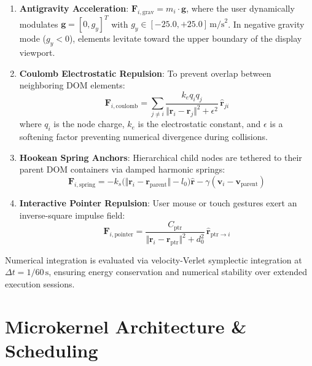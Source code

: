 \documentclass[10pt,twocolumn,letterpaper]{article}
\begin{document}
\begin{enumerate}
    \item \textbf{Antigravity Acceleration}:
    $\mathbf{F}_{i,\mathrm{grav}} = m_i \cdot \mathbf{g}$, where the user dynamically modulates $\mathbf{g} = [0, g_y]^T$ with $g_y \in [-25.0, +25.0]\,\mathrm{m/s}^2$. In negative gravity mode ($g_y < 0$), elements levitate toward the upper boundary of the display viewport.
    
    \item \textbf{Coulomb Electrostatic Repulsion}:
    To prevent overlap between neighboring DOM elements:
    \begin{equation}
        \mathbf{F}_{i,\mathrm{coulomb}} = \sum_{j \neq i} \frac{k_e q_i q_j}{\Vert \mathbf{r}_i - \mathbf{r}_j \Vert^2 + \epsilon^2} \, \hat{\mathbf{r}}_{ji}
    \end{equation}
    where $q_i$ is the node charge, $k_e$ is the electrostatic constant, and $\epsilon$ is a softening factor preventing numerical divergence during collisions.
    
    \item \textbf{Hookean Spring Anchors}:
    Hierarchical child nodes are tethered to their parent DOM containers via damped harmonic springs:
    \begin{equation}
        \mathbf{F}_{i,\mathrm{spring}} = -k_s \big( \Vert \mathbf{r}_i - \mathbf{r}_{\mathrm{parent}} \Vert - l_0 \big) \hat{\mathbf{r}} - \gamma (\mathbf{v}_i - \mathbf{v}_{\mathrm{parent}})
    \end{equation}
    
    \item \textbf{Interactive Pointer Repulsion}:
    User mouse or touch gestures exert an inverse-square impulse field:
    \begin{equation}
        \mathbf{F}_{i,\mathrm{pointer}} = \frac{C_{\mathrm{ptr}}}{\Vert \mathbf{r}_i - \mathbf{r}_{\mathrm{ptr}} \Vert^2 + d_0^2} \, \hat{\mathbf{r}}_{\mathrm{ptr}\to i}
    \end{equation}
\end{enumerate}

Numerical integration is evaluated via velocity-Verlet symplectic integration at $\Delta t = 1/60\,\mathrm{s}$, ensuring energy conservation and numerical stability over extended execution sessions.

\section{Microkernel Architecture \& Scheduling}
\end{document}
